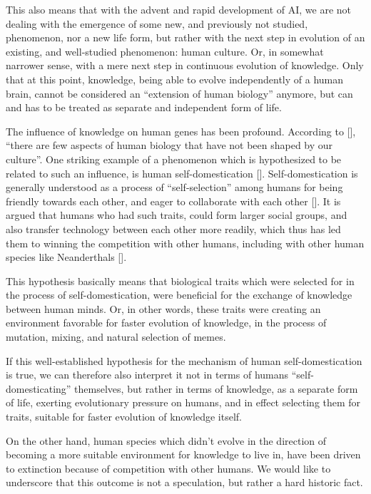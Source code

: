 \documentclass[12pt]{article}
\newcommand{\citestrut}[1]{\vphantom{[}{#1}\vphantom{]}}
\renewcommand{\cite}[1]{[\hyperlink{#1}{\citestrut{#1}}]}
\begin{document}
This also means that with the advent and rapid development of AI, we are not dealing with
the emergence of some new, and previously not studied, phenomenon, nor a new life form,
but rather with the next step in evolution of an existing, and well-studied phenomenon:
human culture. Or, in somewhat narrower sense, with a mere next step in continuous
evolution of knowledge. Only that at this point, knowledge, being able to evolve
independently of a human brain, cannot be considered an ``extension of human biology''
anymore, but can and has to be treated as separate and independent form of life.

The influence of knowledge on human genes has been profound. According to \cite{Culture},
``there are few aspects of human biology that have not been shaped by our culture''. One
striking example of a phenomenon which is hypothesized to be related to such an
influence, is human self-domestication \cite{SelfDomestication}. Self-domestication is
generally understood as a process of ``self-selection'' among humans for being friendly
towards each other, and eager to collaborate with each other \cite{GoodnessParadox}. It
is argued that humans who had such traits, could form larger social groups, and also
transfer technology between each other more readily, which thus has led them to winning
the competition with other humans, including with other human species like Neanderthals
\cite{SelfDomestication}.

This hypothesis basically means that biological traits which were selected for in the
process of self-domestication, were beneficial for the exchange of knowledge between
human minds. Or, in other words, these traits were creating an environment favorable for
faster evolution of knowledge, in the process of mutation, mixing, and natural selection
of memes.

If this well-established hypothesis for the mechanism of human self-domestication is
true, we can therefore also interpret it not in terms of humans ``self-domesticating''
themselves, but rather in terms of knowledge, as a separate form of life, exerting
evolutionary pressure on humans, and in effect selecting them for traits, suitable for
faster evolution of knowledge itself.

On the other hand, human species which didn't evolve in the direction of becoming a more
suitable environment for knowledge to live in, have been driven to extinction because of
competition with other humans. We would like to underscore that this outcome is not a
speculation, but rather a hard historic fact.
\end{document}
